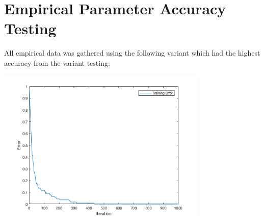 \documentclass[12pt]{article}
\begin{document}

\section{Empirical Parameter Accuracy Testing}
All empirical data was gathered using the following variant which had the highest accuracy from the variant testing:
\begin{center}
  \begin{table}[H]
    \begin{varwidth}[b]{0.4\linewidth}
      \centering
      \label{table:param_base}
    \end{varwidth}%
    \hfill
    \begin{minipage}[b]{0.6\linewidth}
      \centering
      \includegraphics[width=100mm]{YNYNN_training_error.png}
      \label{fig:param_base}
    \end{minipage}
  \end{table}
\end{center}
\end{document}
